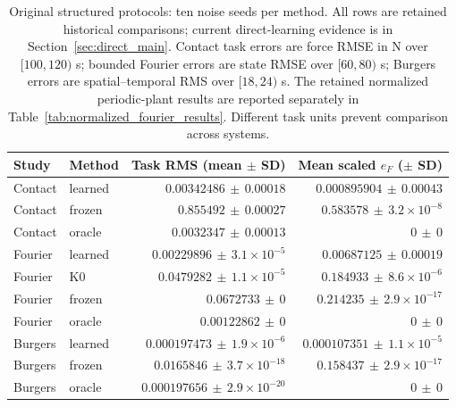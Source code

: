\begin{table}[t]
\centering
\caption{Original structured protocols: ten noise seeds per method. All rows are retained historical comparisons; current direct-learning evidence is in Section~\ref{sec:direct_main}. Contact task errors are force RMSE in N over $[100,120)$ s; bounded Fourier errors are state RMSE over $[60,80)$ s; Burgers errors are spatial--temporal RMS over $[18,24)$ s. The retained normalized periodic-plant results are reported separately in Table~\ref{tab:normalized_fourier_results}. Different task units prevent comparison across systems.}
\begin{tabular}{llrr}
\toprule Study & Method & Task RMS (mean $\pm$ SD) & Mean scaled $e_F$ ($\pm$ SD) \\
\midrule
Contact & learned & $0.00342486\,\pm\,0.00018$ & $0.000895904\,\pm\,0.00043$ \\
Contact & frozen & $0.855492\,\pm\,0.00027$ & $0.583578\,\pm\,3.2\times10^{-8}$ \\
Contact & oracle & $0.0032347\,\pm\,0.00013$ & $0\,\pm\,0$ \\
Fourier & learned & $0.00229896\,\pm\,3.1\times10^{-5}$ & $0.00687125\,\pm\,0.00019$ \\
Fourier & K0 & $0.0479282\,\pm\,1.1\times10^{-5}$ & $0.184933\,\pm\,8.6\times10^{-6}$ \\
Fourier & frozen & $0.0672733\,\pm\,0$ & $0.214235\,\pm\,2.9\times10^{-17}$ \\
Fourier & oracle & $0.00122862\,\pm\,0$ & $0\,\pm\,0$ \\
Burgers & learned & $0.000197473\,\pm\,1.9\times10^{-6}$ & $0.000107351\,\pm\,1.1\times10^{-5}$ \\
Burgers & frozen & $0.0165846\,\pm\,3.7\times10^{-18}$ & $0.158437\,\pm\,2.9\times10^{-17}$ \\
Burgers & oracle & $0.000197656\,\pm\,2.9\times10^{-20}$ & $0\,\pm\,0$ \\
\bottomrule
\end{tabular}
\label{tab:main_results}
\end{table}
